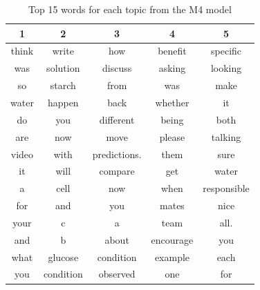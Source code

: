 \documentclass{article}
\begin{document}
\begin{table}
    \begin{center}
    \caption{Top 15 words for each topic from the M4 model}
    \begin{tabular}{ccccc}
        \hline
        1 & 2 & 3 & 4 & 5 \\
        \hline
        think & write & how & benefit & specific  \\
        was & solution & discuss & asking & looking  \\
        so & starch & from & was & make  \\
        water & happen & back & whether & it  \\
        do & you & different & being & both  \\
        are & now & move & please & talking  \\
        video & with & predictions. & them & sure  \\
        it & will & compare & get & water  \\
        a & cell & now & when & responsible  \\
        for & and & you & mates & nice  \\
        your & c & a & team & all.  \\
        and & b & about & encourage & you  \\
        what & glucose & condition & example & each  \\
        you & condition & observed & one & for  \\
        \hline
    \end{tabular}
    \end{center}
    \label{tab:m4}
\end{table}
\end{document}
